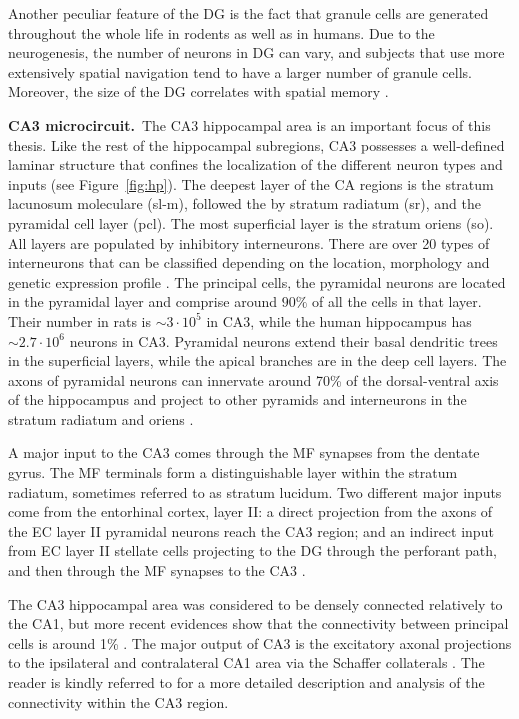     Another peculiar feature of the DG is the fact that granule cells are
    generated throughout the whole life in rodents as well as in humans. Due to
    the neurogenesis, the number of neurons in DG can vary, and subjects that
    use more extensively spatial navigation tend to have a larger number of
    granule cells. Moreover, the size of the DG correlates with spatial memory
    \citep{Maguire2000, Spalding2013}.

    \textbf{CA3 microcircuit.}\,
    The CA3 hippocampal area is an important focus of this thesis. Like the
    rest of the hippocampal subregions, CA3 possesses a well-defined laminar
    structure that confines the localization of the different neuron types and
    inputs (see Figure~\ref{fig:hp}). The deepest layer of the CA regions is
    the stratum lacunosum moleculare (sl-m), followed the by stratum radiatum (sr), and the
    pyramidal cell layer (pcl). The most superficial layer is the stratum
    oriens (so). All layers are populated by inhibitory interneurons. There are
    over 20 types of interneurons that can be classified depending on the
    location, morphology and genetic expression profile \citep{Maccaferri2003,
    Klausberger2008}. The principal cells, the pyramidal neurons are located in
    the pyramidal layer and comprise around $90\%$ of all the cells in that layer. Their
    number in rats is $\sim 3 \cdot 10^5$ \citep{Boss1985, Boss1987} in CA3,
    while the human hippocampus has $\sim 2.7 \cdot 10^6$ neurons in CA3.
    Pyramidal neurons extend their basal dendritic trees in the superficial
    layers, while the apical branches are in the deep cell layers. The axons of
    pyramidal neurons can innervate around 70\% of the dorsal-ventral axis of
    the hippocampus and project to other pyramids and interneurons in the
    stratum radiatum and oriens \citep{Sik1993, Li1994}.

    A major input to the CA3 comes through the MF synapses from the dentate
    gyrus. The MF terminals form a distinguishable layer within the stratum
    radiatum, sometimes referred to as stratum lucidum. Two different major
    inputs come from the entorhinal cortex, layer II: a direct projection from
    the axons of the EC layer II pyramidal neurons reach the CA3 region; and an
    indirect input from EC layer II stellate cells projecting to the DG through
    the perforant path, and then through the MF synapses to the CA3
    \citep{Tang2014}. 
    
    The CA3 hippocampal area was considered to be densely connected 
    \cite[$\sim3 \%
    $ in][]{Miles1986} relatively to the CA1, but more recent evidences show that
    the connectivity between principal cells is around 1\% \citep{Guzman2016}.
    The major output of CA3 is the excitatory axonal projections to the
    ipsilateral and contralateral CA1 area via the Schaffer collaterals
    \citep{Finnerty1993}. The reader is kindly referred to \cite{Duigou2014} for a
    more detailed description and analysis of the connectivity within the
    CA3 region.

